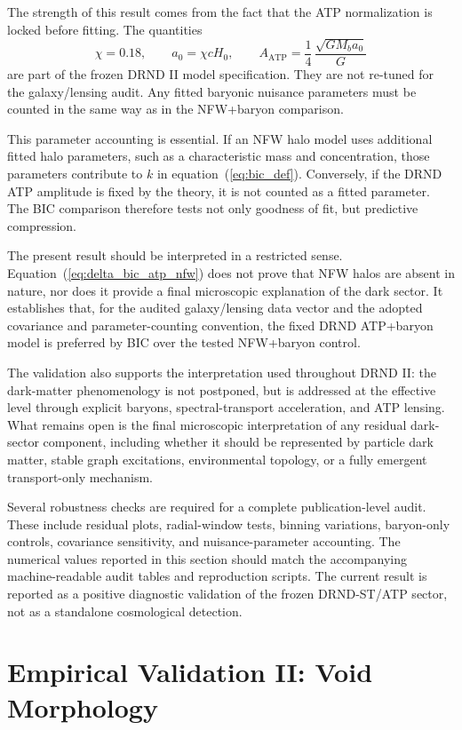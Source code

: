 \documentclass[12pt]{iopart}
\begin{document}
The strength of this result comes from the fact that the ATP normalization is locked before fitting. The quantities
\begin{equation}
\chi=0.18,
\qquad
a_0=\chi cH_0,
\qquad
A_{\mathrm{ATP}}
=
\frac14\,\frac{\sqrt{GM_ba_0}}{G}
\end{equation}
are part of the frozen DRND II model specification. They are not re-tuned for the galaxy/lensing audit. Any fitted baryonic nuisance parameters must be counted in the same way as in the NFW+baryon comparison.

This parameter accounting is essential. If an NFW halo model uses additional fitted halo parameters, such as a characteristic mass and concentration, those parameters contribute to \(k\) in equation~(\ref{eq:bic_def}). Conversely, if the DRND ATP amplitude is fixed by the theory, it is not counted as a fitted parameter. The BIC comparison therefore tests not only goodness of fit, but predictive compression.

The present result should be interpreted in a restricted sense. Equation~(\ref{eq:delta_bic_atp_nfw}) does not prove that NFW halos are absent in nature, nor does it provide a final microscopic explanation of the dark sector. It establishes that, for the audited galaxy/lensing data vector and the adopted covariance and parameter-counting convention, the fixed DRND ATP+baryon model is preferred by BIC over the tested NFW+baryon control.

The validation also supports the interpretation used throughout DRND II: the dark-matter phenomenology is not postponed, but is addressed at the effective level through explicit baryons, spectral-transport acceleration, and ATP lensing. What remains open is the final microscopic interpretation of any residual dark-sector component, including whether it should be represented by particle dark matter, stable graph excitations, environmental topology, or a fully emergent transport-only mechanism.

Several robustness checks are required for a complete publication-level audit. These include residual plots, radial-window tests, binning variations, baryon-only controls, covariance sensitivity, and nuisance-parameter accounting. The numerical values reported in this section should match the accompanying machine-readable audit tables and reproduction scripts. The current result is reported as a positive diagnostic validation of the frozen DRND-ST/ATP sector, not as a standalone cosmological detection.

\section{Empirical Validation II: Void Morphology}
\label{sec:validation_void_morphology}
\end{document}
